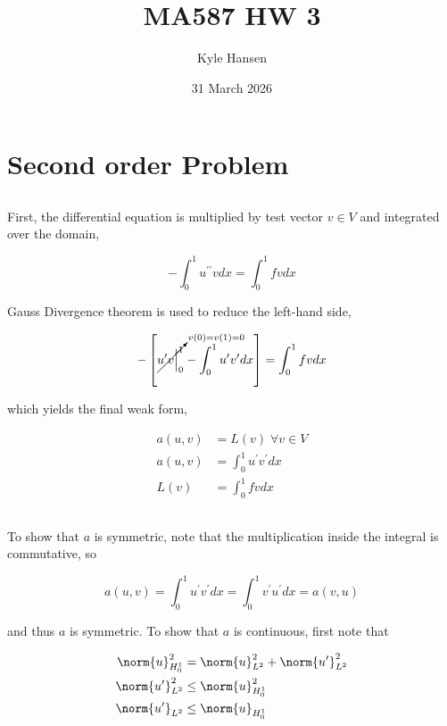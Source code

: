 \documentclass{hw-template}
\title{MA587 HW 3}
\author{Kyle Hansen}
\date{31 March 2026}
\newcommand{\p}{^\prime}
\newcommand{\pr}{\prime}
\newcommand{\hlin}{{H_0^1}}
\newcommand{\ltwo}{{L^2}}
\begin{document}
\maketitle

\section{Second order Problem}

\subsection{}

First, the differential equation is multiplied by test vector $v \in V$ and integrated over the domain,

\begin{equation}
    -\int_{0}^1 u^{\pr\pr}v dx = \int_{0}^1 f v dx
\end{equation}

Gauss Divergence theorem is used to reduce the left-hand side,

\begin{equation}
    - \left[ \cancelto{_{v(0) = v(1) = 0}}{u'v \Big|_{0}^1} - \int_{0}^1 u\p v\p dx \right]= \int_{0}^1 f v dx
\end{equation}

which yields the final weak form,

\begin{align}
    a(u, v) &= L(v)\; \forall v \in V\\
    a(u, v) &= \int_{0}^1 u\p v\p dx\\
    L(v) &= \int_{0}^1 f v dx
\end{align}

\subsection{}

To show that $a$ is symmetric, note that the multiplication inside the integral is commutative, so

\begin{equation}
    a(u, v) = \int_{0}^1 u\p v\p dx = \int_{0}^1 v\p u\p dx = a(v, u)
\end{equation}

and thus $a$ is symmetric. To show that $a$ is continuous, first note that

\begin{align}
    \norm{u}_{\hlin}^2 &= \norm{u}_{\ltwo}^2 + \norm{u\p}_{\ltwo}^2\\
    \norm{u\p}_{\ltwo}^2 &\leq \norm{u}_{\hlin}^2\\
    \norm{u\p}_{\ltwo} &\leq \norm{u}_{\hlin}\label{eq:p1-lemma}
\end{align}
\end{document}
